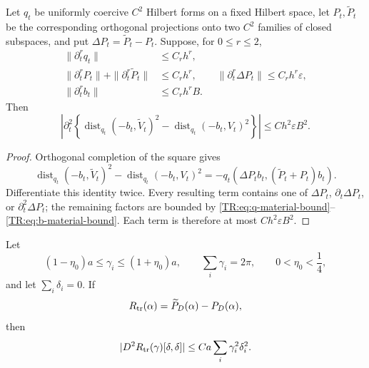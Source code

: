 \begin{lemma}
\label{TR:lem:projection-calculus}
Let $q_t$ be uniformly coercive $C^2$ Hilbert forms on a fixed Hilbert
space, let $P_t,\widetilde P_t$ be the corresponding orthogonal
projections onto two $C^2$ families of closed subspaces, and put
$\Delta P_t=\widetilde P_t-P_t$.  Suppose, for $0\le r\le2$,
\begin{align}
 \|\partial_t^rq_t\|&\le C_rh^r,
 \label{TR:eq:q-material-bound}\\
 \|\partial_t^rP_t\|+\|\partial_t^r\widetilde P_t\|
 &\le C_rh^r,
 \qquad
 \|\partial_t^r\Delta P_t\|\le C_rh^r\varepsilon,
 \label{TR:eq:P-material-bound}\\
 \|\partial_t^rb_t\|&\le C_rh^rB.
 \label{TR:eq:b-material-bound}
\end{align}
Then
\begin{equation}\label{TR:eq:projection-calculus-output}
 \left|\partial_t^2\left\{
 \operatorname {dist}_{q_t}(-b_t,\widetilde V_t)^2-
 \operatorname {dist}_{q_t}(-b_t,V_t)^2\right\}\right|
 \le Ch^2\varepsilon B^2.
\end{equation}
\end{lemma}

\begin{proof}
Orthogonal completion of the square gives
\begin{equation}\label{TR:eq:projection-difference-identity}
 \operatorname {dist}_{q_t}(-b_t,\widetilde V_t)^2-
 \operatorname {dist}_{q_t}(-b_t,V_t)^2
 =-q_t(\Delta P_tb_t,(\widetilde P_t+P_t)b_t).
\end{equation}
Differentiate this identity twice.  Every resulting term contains one of
$\Delta P_t$, $\partial_t\Delta P_t$, or
$\partial_t^2\Delta P_t$; the remaining factors are bounded by
\eqref{TR:eq:q-material-bound}--\eqref{TR:eq:b-material-bound}.  Each term is
therefore at most $Ch^2\varepsilon B^2$.
\end{proof}

\begin{lemma}
\label{TR:lem:material-calculus}
Let
\begin{equation}\label{TR:eq:quasiuniform-band}
 (1-\eta_0)a\le\gamma_i\le(1+\eta_0)a,\qquad
 \sum_i\gamma_i=2\pi,\qquad 0<\eta_0<\frac14,
\end{equation}
and let $\sum_i\delta_i=0$.  If
\begin{equation}\label{TR:eq:Rtr}
 R_{\rm tr}(\alpha)=\widetilde P_D(\alpha)-P_D(\alpha),
\end{equation}
then
\begin{equation}\label{TR:eq:transfer-hessian}
 |D^2R_{\rm tr}(\gamma)[\delta,\delta]|
 \le Ca\sum_i\gamma_i^2\delta_i^2.
\end{equation}
\end{lemma}

